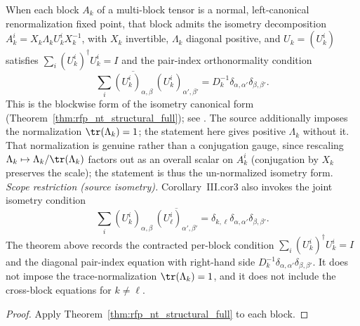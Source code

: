 \begin{theorem}%
    \label{thm:rfp_nt_structural_full_blocks}
    \leanok
    When each block $A_k$ of a multi-block tensor is a normal, left-canonical
    renormalization fixed point, that block admits the isometry decomposition
    $A_k^i = X_k \Lambda_k U_k^i X_k^{-1}$, with $X_k$ invertible, $\Lambda_k$
    diagonal positive, and $U_k = (U_k^i)$ satisfies
    $\sum_i (U_k^i)^\dagger U_k^i = I$ and the pair-index orthonormality
    condition
    \[
        \sum_i \overline{(U_k^i)_{\alpha,\beta}}\,
        (U_k^i)_{\alpha',\beta'}
        =
        D_k^{-1}\delta_{\alpha,\alpha'}\delta_{\beta,\beta'} .
    \]
    This is the blockwise form of the isometry canonical form
    (Theorem~\ref{thm:rfp_nt_structural_full}); see
    \cite[Section~3]{Cirac2016MPDO_arXiv}. The source additionally imposes the
    normalization $\tr(\Lambda_k) = 1$; the statement here gives positive
    $\Lambda_k$ without it. That normalization is genuine rather than a
    conjugation gauge, since rescaling $\Lambda_k \mapsto \Lambda_k/\tr(\Lambda_k)$
    factors out as an overall scalar on $A_k^i$ (conjugation by $X_k$ preserves
    the scale); the statement is thus the un-normalized isometry form.
    \emph{Scope restriction (source isometry).} Corollary~III.cor3 also
    invokes the joint isometry condition
    \[
        \sum_i (U_k^i)_{\alpha,\beta}\,
            \overline{(U_\ell^i)_{\alpha',\beta'}}
        =
        \delta_{k,\ell}\delta_{\alpha,\alpha'}\delta_{\beta,\beta'}.
    \]
    The theorem above records the contracted per-block condition
    $\sum_i (U_k^i)^\dagger U_k^i=I$ and the diagonal pair-index equation with
    right-hand side
    $D_k^{-1}\delta_{\alpha,\alpha'}\delta_{\beta,\beta'}$. It does not impose
    the trace-normalization
    $\tr(\Lambda_k)=1$, and it does not include the cross-block equations for
    $k\ne\ell$.
\end{theorem}
\begin{proof}\leanok
    Apply Theorem~\ref{thm:rfp_nt_structural_full} to each block.
\end{proof}

